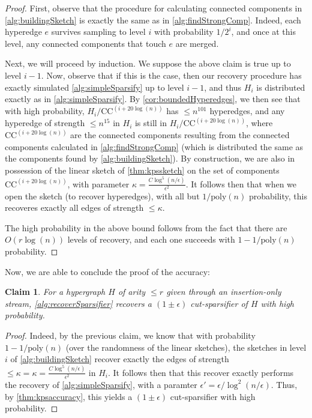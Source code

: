 \documentclass[11pt]{article}
\newtheorem{claim}[theorem]{Claim}
\theoremstyle{definition}
\newcommand{\eps}{\epsilon}
\begin{document}
\begin{proof}
First, observe that the procedure for calculating connected components in \cref{alg:buildingSketch} is exactly the same as in \cref{alg:findStrongComp}. Indeed, each hyperedge $e$ survives sampling to level $i$ with probability $1 / 2^i$, and once at this level, any connected components that touch $e$ are merged. 
	
	
Next, we will proceed by induction. We suppose the above claim is true up to level $i-1$. Now, observe that if this is the case, then our recovery procedure has exactly simulated \cref{alg:simpleSparsify} up to level $i-1$, and thus $H_i$ is distributed exactly as in \cref{alg:simpleSparsify}.  By \cref{cor:boundedHyperedges}, we then see that with high probability, $H_i /  \mathrm{CC}^{(i + 20 \log(n))}$ has $\leq n^{101}$ hyperedges, and any hyperedge of strength $\leq n^{15}$ in $H_i$ is still in $H_i /  \mathrm{CC}^{(i + 20 \log(n))}$, where $\mathrm{CC}^{(i + 20 \log(n))}$ are the connected components resulting from the connected components calculated in \cref{alg:findStrongComp} (which is distributed the same as the components found by \cref{alg:buildingSketch}). By construction, we are also in possession of the linear sketch of \cref{thm:kpssketch} on the set of components $\mathrm{CC}^{(i + 20 \log(n))}$, with parameter $\kappa =  \frac{C \log^5(n / \eps)}{ \eps^2} $. It follows then that when we open the sketch (to recover hyperedges), with all but $1  / \mathrm{poly}(n)$ probability, this recoveres exactly all edges of strength $\leq \kappa$.

The high probability in the above bound follows from the fact that there are $O(r \log(n))$ levels of recovery, and each one succeeds with $1 -1 / \mathrm{poly}(n)$ probability. 
\end{proof}

Now, we are able to conclude the proof of the accuracy:

\begin{claim}\label{clm:accuracyInsertion}
	For a hypergraph $H$ of arity $\leq r$ given through an insertion-only stream, \cref{alg:recoverSparsifier} recovers a $(1 \pm \eps)$ cut-sparsifier of $H$ with high probability. 
\end{claim}

\begin{proof}
Indeed, by the previous claim, we know that with probability $1 - 1 / \mathrm{poly}(n)$ (over the randomness of the linear sketches), the sketches in level $i$ of \cref{alg:buildingSketch} recover exactly the edges of strength $\leq \kappa = \kappa =  \frac{C \log^5(n / \eps)}{ \eps^2}$ in $H_i$. It follows then that this recover exactly performs the recovery of \cref{alg:simpleSparsify}, with a paramter $\eps' = \eps / \log^2(n / \eps)$. Thus, by \cref{thm:kpsaccuracy}, this yields a $(1 \pm \eps)$ cut-sparsifier with high probability. 
\end{proof}
\end{document}
